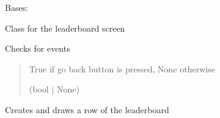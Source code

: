 \documentclass[letterpaper,10pt,english]{sphinxmanual}
\begin{document}
\begin{fulllineitems}
\label{\detokenize{leaderboard:leaderboard.Leaderboard}}
\pysigstartsignatures
{}
\pysigstopsignatures
\sphinxAtStartPar
Bases: 

\sphinxAtStartPar
Class for the leaderboard screen

\begin{fulllineitems}
\label{\detokenize{leaderboard:leaderboard.Leaderboard.check_events}}
\pysigstartsignatures
{}
\pysigstopsignatures
\sphinxAtStartPar
Checks for events
\begin{quote}\begin{description}
\sphinxAtStartPar
True if go back button is pressed, None otherwise

\sphinxAtStartPar
(bool | None)

\end{description}\end{quote}

\end{fulllineitems}


\begin{fulllineitems}
\label{\detokenize{leaderboard:leaderboard.Leaderboard.create_draw_row}}
\pysigstartsignatures
{}
\pysigstopsignatures
\sphinxAtStartPar
Creates and draws a row of the leaderboard

\end{fulllineitems}


\end{fulllineitems}
\end{document}
